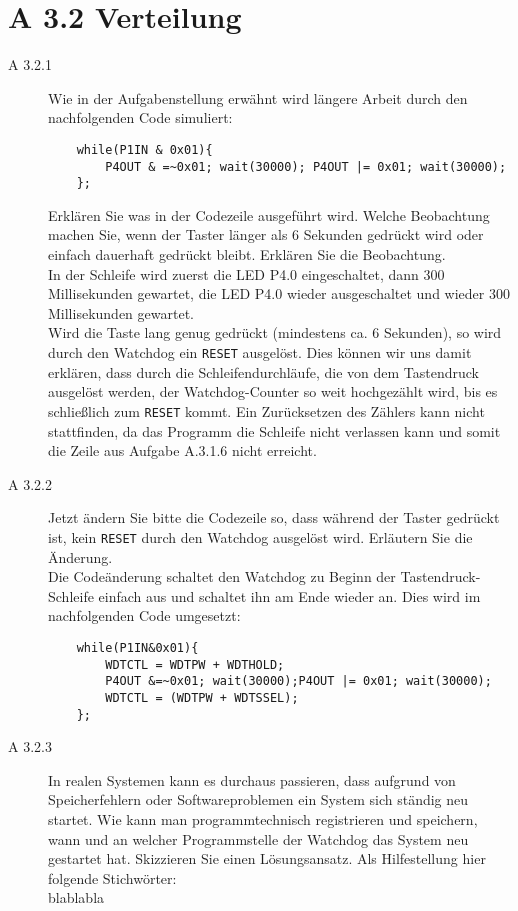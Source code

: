 \documentclass[11pt,a4paper,ngerman]{article}
\begin{document}
\newpage
\section*{A 3.2 Verteilung}
\begin{description}
	\item[A 3.2.1] Wie in der Aufgabenstellung erwähnt wird längere Arbeit durch den nachfolgenden Code simuliert:
		\begin{lstlisting}
	while(P1IN & 0x01){
		P4OUT & =~0x01; wait(30000); P4OUT |= 0x01; wait(30000);
	};
        \end{lstlisting}
Erklären Sie was in der Codezeile ausgeführt wird. Welche Beobachtung machen Sie, wenn der Taster länger als 6 Sekunden gedrückt wird oder einfach dauerhaft gedrückt bleibt. Erklären Sie die Beobachtung. \\

	In der Schleife wird zuerst die LED P4.0 eingeschaltet, dann 300 Millisekunden gewartet, die LED P4.0 wieder ausgeschaltet und wieder 300 Millisekunden gewartet.\\
	Wird die Taste lang genug gedrückt (mindestens ca. 6 Sekunden), so wird durch den Watchdog ein \texttt{RESET} ausgelöst. Dies können wir uns damit erklären, dass durch die Schleifendurchläufe, die von dem Tastendruck ausgelöst werden, der Watchdog-Counter so weit hochgezählt wird, bis es schließlich zum \texttt{RESET} kommt. Ein Zurücksetzen des Zählers kann nicht stattfinden, da das Programm die Schleife nicht verlassen kann und somit die Zeile aus Aufgabe A.3.1.6 nicht erreicht.

	\item[A 3.2.2] Jetzt ändern Sie bitte die Codezeile so, dass während der Taster gedrückt ist, kein \texttt{RESET} durch den Watchdog ausgelöst wird. Erläutern Sie die Änderung. \\
	
	Die Codeänderung schaltet den Watchdog zu Beginn der Tastendruck-Schleife einfach aus und schaltet ihn am Ende wieder an. Dies wird im nachfolgenden Code umgesetzt:
	\begin{lstlisting}
	while(P1IN&0x01){
		WDTCTL = WDTPW + WDTHOLD;
		P4OUT &=~0x01; wait(30000);P4OUT |= 0x01; wait(30000);
		WDTCTL = (WDTPW + WDTSSEL);
	};
	\end{lstlisting}
	
	\item[A 3.2.3] In realen Systemen kann es durchaus passieren, dass aufgrund von Speicherfehlern oder Softwareproblemen ein System sich ständig neu startet. Wie kann man programmtechnisch registrieren und speichern, wann und an welcher Programmstelle der Watchdog das System neu gestartet hat. Skizzieren Sie einen Lösungsansatz. Als Hilfestellung hier folgende Stichwörter: \\
	
blablabla
\end{description}
\end{document}
